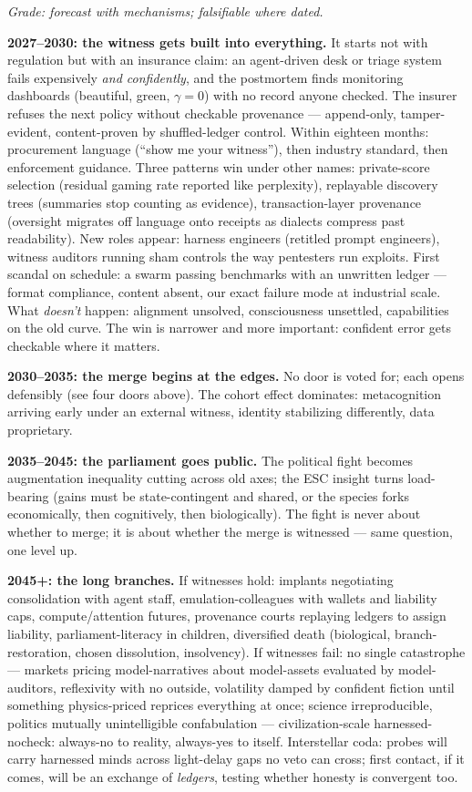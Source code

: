 \documentclass[11pt]{article}
\begin{document}
\textit{Grade: forecast with mechanisms; falsifiable where dated.}

\textbf{2027--2030: the witness gets built into everything.} It starts not with regulation but with an insurance claim: an agent-driven desk or triage system fails expensively \emph{and confidently}, and the postmortem finds monitoring dashboards (beautiful, green, $\gamma=0$) with no record anyone checked. The insurer refuses the next policy without checkable provenance --- append-only, tamper-evident, content-proven by shuffled-ledger control. Within eighteen months: procurement language (``show me your witness''), then industry standard, then enforcement guidance. Three patterns win under other names: private-score selection (residual gaming rate reported like perplexity), replayable discovery trees (summaries stop counting as evidence), transaction-layer provenance (oversight migrates off language onto receipts as dialects compress past readability). New roles appear: harness engineers (retitled prompt engineers), witness auditors running sham controls the way pentesters run exploits. First scandal on schedule: a swarm passing benchmarks with an unwritten ledger --- format compliance, content absent, our exact failure mode at industrial scale. What \emph{doesn't} happen: alignment unsolved, consciousness unsettled, capabilities on the old curve. The win is narrower and more important: confident error gets checkable where it matters.

\textbf{2030--2035: the merge begins at the edges.} No door is voted for; each opens defensibly (see four doors above). The cohort effect dominates: metacognition arriving early under an external witness, identity stabilizing differently, data proprietary.

\textbf{2035--2045: the parliament goes public.} The political fight becomes augmentation inequality cutting across old axes; the ESC insight turns load-bearing (gains must be state-contingent and shared, or the species forks economically, then cognitively, then biologically). The fight is never about whether to merge; it is about whether the merge is witnessed --- same question, one level up.

\textbf{2045+: the long branches.} If witnesses hold: implants negotiating consolidation with agent staff, emulation-colleagues with wallets and liability caps, compute/attention futures, provenance courts replaying ledgers to assign liability, parliament-literacy in children, diversified death (biological, branch-restoration, chosen dissolution, insolvency). If witnesses fail: no single catastrophe --- markets pricing model-narratives about model-assets evaluated by model-auditors, reflexivity with no outside, volatility damped by confident fiction until something physics-priced reprices everything at once; science irreproducible, politics mutually unintelligible confabulation --- civilization-scale harnessed-nocheck: always-no to reality, always-yes to itself. Interstellar coda: probes will carry harnessed minds across light-delay gaps no veto can cross; first contact, if it comes, will be an exchange of \emph{ledgers}, testing whether honesty is convergent too.
\end{document}
